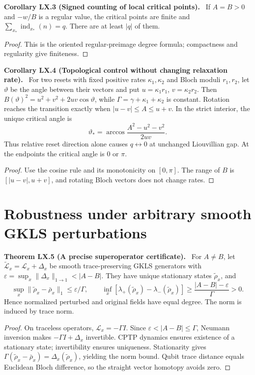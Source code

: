 \documentclass[11pt,a4paper,oneside]{book}
\newcommand{\statement}[3]{\par\medskip\noindent\textbf{#1 #2 (#3).}\ }
\begin{document}
\statement{Corollary}{LX.3}{Signed counting of local critical points}
If $A=B>0$ and $-w/B$ is a regular value, the critical points are finite and $\sum_{x_*}\operatorname{ind}_{x_*}(n)=q$. There are at least $|q|$ of them.
\begin{proof}
This is the oriented regular-preimage degree formula; compactness and regularity give finiteness.
\end{proof}
\statement{Corollary}{LX.4}{Topological control without changing relaxation rate}
For two resets with fixed positive rates $\kappa_1,\kappa_2$ and Bloch moduli $r_1,r_2$, let $\vartheta$ be the angle between their vectors and put $u=\kappa_1r_1$, $v=\kappa_2r_2$. Then $B(\vartheta)^2=u^2+v^2+2uv\cos\vartheta$, while $\Gamma=\gamma+\kappa_1+\kappa_2$ is constant. Rotation reaches the transition exactly when $|u-v|\le A\le u+v$. In the strict interior, the unique critical angle is
\[\vartheta_* =\arccos\frac{A^2-u^2-v^2}{2uv}.\]
Thus relative reset direction alone causes $q\leftrightarrow0$ at unchanged Liouvillian gap. At the endpoints the critical angle is 0 or $\pi$.
\begin{proof}
Use the cosine rule and its monotonicity on $[0,\pi]$. The range of $B$ is $[|u-v|,u+v]$, and rotating Bloch vectors does not change rates.
\end{proof}
\section{Robustness under arbitrary smooth GKLS perturbations}
\statement{Theorem}{LX.5}{A precise superoperator certificate}
For $A\ne B$, let $\widetilde{\mathcal L}_x=\mathcal L_x+\Delta_x$ be smooth trace-preserving GKLS generators with $\varepsilon=\sup_x\|\Delta_x\|_{1\to1}<|A-B|$. They have unique stationary states $\widetilde\rho_x$, and
\[\sup_x\|\widetilde\rho_x-\bar\rho_x\|_1\le\varepsilon/\Gamma,\qquad\inf_x[\lambda_+(\widetilde\rho_x)-\lambda_-(\widetilde\rho_x)]\ge\frac{|A-B|-\varepsilon}{\Gamma}>0.\]
Hence normalized perturbed and original fields have equal degree. The norm is induced by trace norm.
\begin{proof}
On traceless operators, $\mathcal L_x=-\Gamma I$. Since $\varepsilon<|A-B|\le\Gamma$, Neumann inversion makes $-\Gamma I+\Delta_x$ invertible. CPTP dynamics ensures existence of a stationary state; invertibility ensures uniqueness. Stationarity gives $\Gamma(\widetilde\rho_x-\bar\rho_x)=\Delta_x(\widetilde\rho_x)$, yielding the norm bound. Qubit trace distance equals Euclidean Bloch difference, so the straight vector homotopy avoids zero.
\end{proof}
\end{document}

